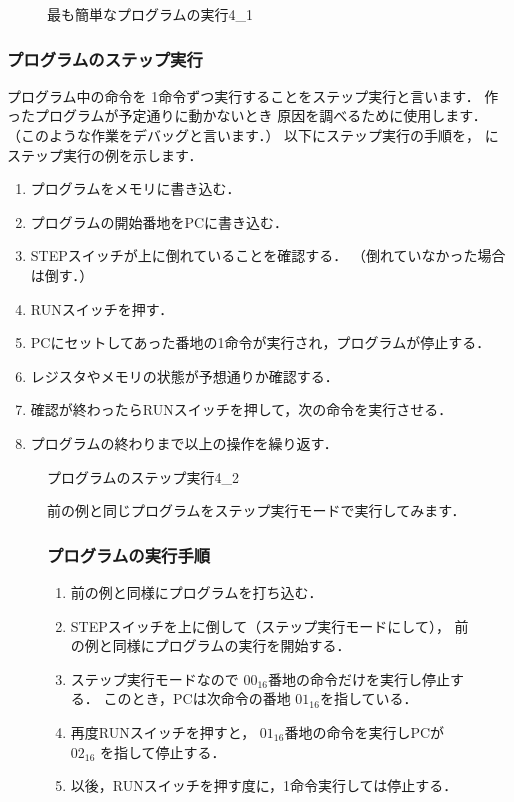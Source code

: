\begin{figure}[tb]
\begin{rei}{最も簡単なプログラムの実行}{4_1}
  \end{rei}
\end{figure}

\subsubsection{プログラムのステップ実行}
\label{step}
プログラム中の命令を
1命令ずつ実行することをステップ実行と言います．
作ったプログラムが予定通りに動かないとき
原因を調べるために使用します．
（このような作業をデバッグと言います．）
以下にステップ実行の手順を，
にステップ実行の例を示します．

\begin{enumerate}
\item プログラムをメモリに書き込む．
\item プログラムの開始番地をPCに書き込む．
\item STEPスイッチが上に倒れていることを確認する．
  （倒れていなかった場合は倒す．）
\item RUNスイッチを押す．
\item PCにセットしてあった番地の1命令が実行され，プログラムが停止する．
\item レジスタやメモリの状態が予想通りか確認する．
\item 確認が終わったらRUNスイッチを押して，次の命令を実行させる．
\item プログラムの終わりまで以上の操作を繰り返す．
\end{enumerate}

\begin{figure}[tb]
  \begin{rei}{プログラムのステップ実行}{4_2}

    前の例と同じプログラムをステップ実行モードで実行してみます．

    \subsubsection{プログラムの実行手順}
    \begin{enumerate}
    \item 前の例と同様にプログラムを打ち込む．
    \item STEPスイッチを上に倒して（ステップ実行モードにして），
      前の例と同様にプログラムの実行を開始する．
    \item ステップ実行モードなので
      $00_{16}$番地の命令だけを実行し停止する．
      このとき，PCは次命令の番地 $01_{16}$を指している．
    \item 再度RUNスイッチを押すと，
      $01_{16}$番地の命令を実行しPCが $02_{16}$ を指して停止する．
    \item 以後，RUNスイッチを押す度に，1命令実行しては停止する．
    \end{enumerate}
  \end{rei}
\end{figure}

